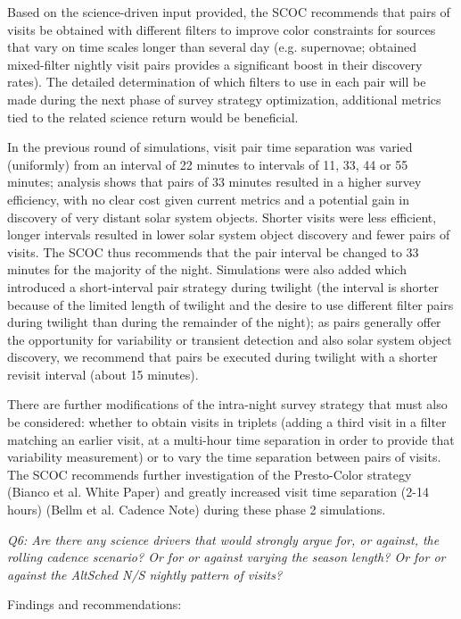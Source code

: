 Based on the science-driven input provided, the SCOC recommends that pairs of visits be obtained with different filters to improve color constraints for sources that vary on time scales longer than several day (e.g. supernovae;  obtained mixed-filter nightly visit pairs provides a significant boost in their discovery rates). The detailed determination of which filters to use in each pair will be made during the next phase of survey strategy optimization, additional metrics tied to the related science return would be beneficial.  

In the previous round of simulations, visit pair time separation was varied (uniformly) from an interval of 22 minutes to intervals of 11, 33, 44 or 55 minutes; analysis shows that pairs of 33 minutes resulted in a higher survey efficiency, with no clear cost given current metrics and a potential gain in discovery of very distant solar system objects. Shorter visits were less efficient, longer intervals resulted in lower solar system object discovery and fewer pairs of visits. The SCOC thus recommends that the pair interval be changed to 33 minutes for the majority of the night. Simulations were also added which introduced a short-interval pair strategy during twilight (the interval is shorter because of the limited length of twilight and the desire to use different filter pairs during twilight than during the remainder of the night); as pairs generally offer the opportunity for variability or transient detection and also solar system object discovery, we recommend that pairs be executed during twilight with a shorter revisit interval (about 15 minutes). 

There are further modifications of the intra-night survey strategy that must also be considered: whether to obtain visits in triplets (adding a third visit in a filter matching an earlier visit, at a multi-hour time separation in order to provide that variability measurement) or to vary the time separation between pairs of visits. The SCOC recommends further investigation of the Presto-Color strategy (Bianco et al. White Paper) and greatly increased visit time separation (2-14 hours) (Bellm et al. Cadence Note) during these phase 2 simulations. 


{\it Q6:  Are there any science drivers that would strongly argue for, or against, the rolling cadence scenario? Or for or against varying the season length? Or for or against the AltSched N/S nightly pattern of visits? }

Findings and recommendations:

